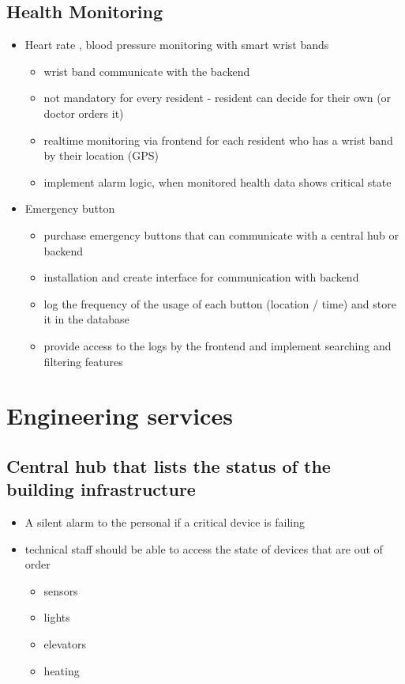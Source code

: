 \documentclass
[
 12pt, %
       DIV12,
       a4paper, %
       oneside, %
       titlepage, %
       parskip=half, %
       headings=normal, %
       listof=totoc, %
       bibliography=totoc, %
       index=totoc, %
       captions=tableheading, %
       ]{scrreprt}
\begin{document}
\section{Health Monitoring}
\label{sec:org7095bad}
\begin{itemize}
\item Heart rate , blood pressure monitoring with smart wrist bands
\begin{itemize}
\item wrist band communicate with the backend
\item not mandatory for every resident - resident can decide for their own (or doctor orders it)
\item realtime monitoring via frontend for each resident who has a wrist band by their location (GPS)
\item implement alarm logic, when monitored health data shows critical state
\end{itemize}

\item Emergency button
\begin{itemize}
\item purchase emergency buttons that can communicate with a central hub or backend
\item installation and create interface for communication with backend
\item log the frequency of the usage of each button (location / time) and store it in the database
\item provide access to the logs by the frontend and implement searching and filtering features
\end{itemize}
\end{itemize}

\chapter{Engineering services}
\label{sec:org9bff4f6}
\section{Central hub that lists the status of the building infrastructure}
\label{sec:org7e7f71c}
\begin{itemize}
\item A silent alarm to the personal if a critical device is failing
\item technical staff should be able to access the state of devices that are out of order
\begin{itemize}
\item sensors
\item lights
\item elevators
\item heating
\end{itemize}
\end{itemize}
\end{document}
